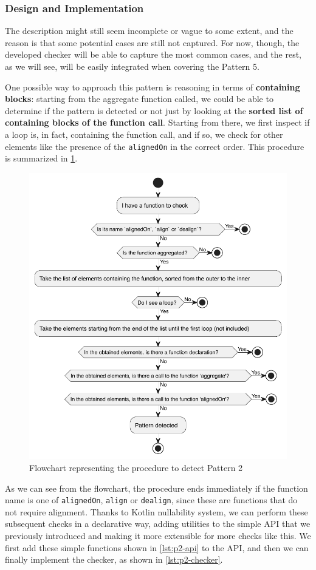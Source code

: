 \documentclass[12pt,a4paper,openright,twoside]{book}
\begin{document}
\subsubsection{Design and Implementation}

The description might still seem incomplete or vague to some extent, and the
reason is that some potential cases are still not captured. For now, though, the
developed checker will be able to capture the most common cases, and the rest,
as we will see, will be easily integrated when covering the Pattern 5. 

One possible way to approach this pattern is reasoning in terms of
\textbf{containing blocks}: starting from the aggregate function called, we
could be able to determine if the pattern is detected or not just by looking at
the \textbf{sorted list of containing blocks of the function call}. Starting
from there, we first inspect if a loop is, in fact, containing the function
call, and if so, we check for other elements like the presence of the
\lstinline{alignedOn} in the correct order. This procedure is summarized in
\cref{fig:p2-flowchart}.

\begin{figure}
  \centering
  \includegraphics[width=.6\linewidth]{figures/p2-flowchart.pdf}
  \caption{Flowchart representing the procedure to detect Pattern 2}
  \label{fig:p2-flowchart}
\end{figure}

As we can see from the flowchart, the procedure ends immediately if the function
name is one of \lstinline{alignedOn}, \lstinline{align} or \lstinline{dealign},
since these are functions that do not require alignment. Thanks to Kotlin 
nullability system, we can perform these subsequent checks in a declarative way,
adding utilities to the simple API that we previously introduced and making it 
more extensible for more checks like this.
%
We first add these simple functions shown in \cref{lst:p2-api} to the API, and
then we can finally implement the checker, as shown in \cref{lst:p2-checker}. 
\end{document}
